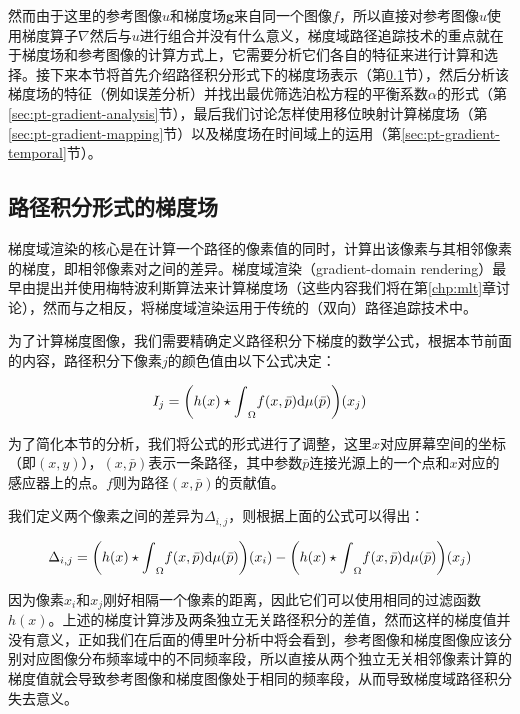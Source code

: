 然而由于这里的参考图像$u$和梯度场$\mathbf{g}$来自同一个图像$f$，所以直接对参考图像$u$使用梯度算子$\nabla$然后与$u$进行组合并没有什么意义，梯度域路径追踪技术的重点就在于梯度场和参考图像的计算方式上，它需要分析它们各自的特征来进行计算和选择。接下来本节将首先介绍路径积分形式下的梯度场表示（第\ref{sec:pt-gradient-form}节），然后分析该梯度场的特征（例如误差分析）并找出最优筛选泊松方程的平衡系数$\alpha$的形式（第\ref{sec:pt-gradient-analysis}节），最后我们讨论怎样使用移位映射计算梯度场（第\ref{sec:pt-gradient-mapping}节）以及梯度场在时间域上的运用（第\ref{sec:pt-gradient-temporal}节）。





\subsection{路径积分形式的梯度场}\label{sec:pt-gradient-form}
梯度域渲染的核心是在计算一个路径的像素值的同时，计算出该像素与其相邻像素的梯度，即相邻像素对之间的差异。梯度域渲染（gradient-domain rendering）最早由\cite{a:GradientDomainMetropolisLightTransport}提出并使用梅特波利斯算法来计算梯度场（这些内容我们将在第\ref{chp:mlt}章讨论），然而与之相反，\cite{a:GradientDomainPathTracing,a:Gradient-DomainBidirectionalPathTracing}将梯度域渲染运用于传统的（双向）路径追踪技术中。

为了计算梯度图像，我们需要精确定义路径积分下梯度的数学公式，根据本节前面的内容，路径积分下像素$j$的颜色值由以下公式决定：

\begin{equation}
	I_j=\bigg(h(x)\star{\rm \int}_\Omega f(x, \bar{p}){\rm d}\mu(\bar{p})  \bigg)(x_j)
\end{equation}

\noindent 为了简化本节的分析，我们将公式的形式进行了调整，这里$x$对应屏幕空间的坐标（即$(x,y)$），$(x,\bar{p})$表示一条路径，其中参数$\bar{p}$连接光源上的一个点和$x$对应的感应器上的点。$f$则为路径$(x,\bar{p})$的贡献值。 

我们定义两个像素之间的差异为$\Delta_{i,j}$，则根据上面的公式可以得出：

\begin{equation}
	\Delta_{i,j}=\bigg(h(x)\star{\rm \int}_\Omega f(x, \bar{p}){\rm d}\mu(\bar{p})  \bigg)(x_i)-\bigg(h(x)\star{\rm \int}_\Omega f(x, \bar{p}){\rm d}\mu(\bar{p})  \bigg)(x_j)
\end{equation}

\noindent 因为像素$x_i$和$x_j$刚好相隔一个像素的距离，因此它们可以使用相同的过滤函数$h(x)$。上述的梯度计算涉及两条独立无关路径积分的差值，然而这样的梯度值并没有意义，正如我们在后面的傅里叶分析中将会看到，参考图像和梯度图像应该分别对应图像分布频率域中的不同频率段，所以直接从两个独立无关相邻像素计算的梯度值就会导致参考图像和梯度图像处于相同的频率段，从而导致梯度域路径积分失去意义。

